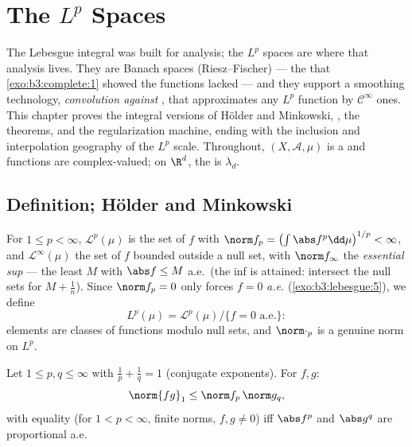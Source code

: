 \chapter{The \texorpdfstring{$L^p$}{Lp} Spaces}\label{ch:b3:lp}

The Lebesgue integral was built for analysis; the $L^p$ spaces
are where that analysis lives. They are Banach spaces
(Riesz--Fischer) --- the  that
\cref{exo:b3:complete:1} showed the  functions
lacked --- and they support a smoothing technology,
\emph{convolution against }, that approximates any
$L^p$ function by $\mathcal C^\infty$ ones. This chapter proves
the integral versions of H\"older and Minkowski, ,
the  theorems, and the regularization machine, ending
with the inclusion and interpolation geography of the $L^p$
scale. Throughout, $(X, \mathcal A, \mu)$ is a 
and functions are complex-valued; on $\R^d$, the  is
$\lambda_d$.

\section{Definition; H\"older and Minkowski}

\begin{definition}\label{def:b3:lp:space}
For $1 \leq p < \infty$, $\mathcal L^p(\mu)$ is the set of
 $f$ with $\norm f_p = \bigl(\int\abs
f^p\dd\mu\bigr)^{1/p} < \infty$, and $\mathcal L^\infty(\mu)$
the set of $f$ bounded outside a null set, with $\norm
f_\infty$ the \emph{essential sup} --- the least $M$ with
$\abs f \leq M$ a.e.\ (the inf is attained: intersect the null
sets for $M + \frac1n$). Since $\norm f_p = 0$ only forces $f
= 0$ \emph{a.e.} (\cref{exo:b3:lebesgue:5}), we define
\[
L^p(\mu) = \mathcal L^p(\mu)/\{f = 0 \text{ a.e.}\} :
\]
elements are classes of functions modulo null sets, and
$\norm\cdot_p$ is a genuine norm on
$L^p$.
\end{definition}

\begin{theorem}\label{thm:b3:lp:holder}
Let $1 \leq p, q \leq \infty$ with $\frac1p + \frac1q = 1$
(conjugate exponents). For  $f, g$:
\[
\norm{fg}_1 \leq \norm f_p\,\norm g_q ,
\]
with equality (for $1 < p < \infty$, finite norms, $f,g\ne0$)
iff $\abs f^p$ and $\abs g^q$ are proportional a.e.
\end{theorem}

